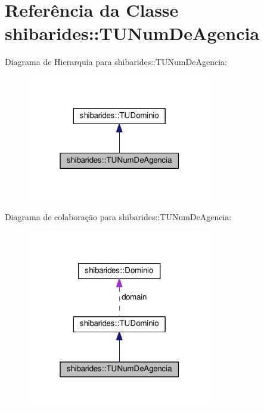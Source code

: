 \hypertarget{classshibarides_1_1TUNumDeAgencia}{}\section{Referência da Classe shibarides\+:\+:T\+U\+Num\+De\+Agencia}
\label{classshibarides_1_1TUNumDeAgencia}


Diagrama de Hierarquia para shibarides\+:\+:T\+U\+Num\+De\+Agencia\+:\nopagebreak
\begin{figure}[H]
\begin{center}
\leavevmode
\includegraphics[width=229pt]{classshibarides_1_1TUNumDeAgencia__inherit__graph}
\end{center}
\end{figure}


Diagrama de colaboração para shibarides\+:\+:T\+U\+Num\+De\+Agencia\+:\nopagebreak
\begin{figure}[H]
\begin{center}
\leavevmode
\includegraphics[width=229pt]{classshibarides_1_1TUNumDeAgencia__coll__graph}
\end{center}
\end{figure}

